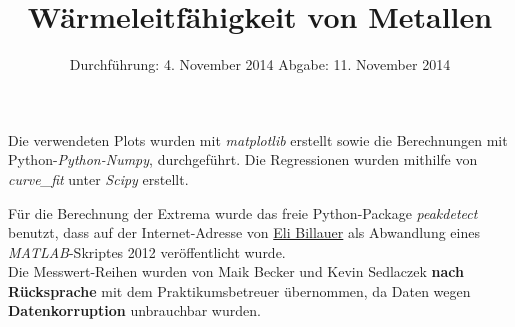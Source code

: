 
\usepackage{longtable}

\subject{Versuch 204}
\title{Wärmeleitfähigkeit von Metallen}

\date{
  Durchführung: 4. November 2014
  \hspace{1em}
  Abgabe: 11. November 2014
}


\maketitle
\thispagestyle{empty}
\newpage
\nocite{Helena}




%
%
%


\printbibliography
\noindent Die verwendeten Plots wurden mit \textit{matplotlib}\cite{matplotlib} erstellt sowie die Berechnungen mit Python-\textit{Python-Numpy}, \cite{numpy} durchgeführt.
Die Regressionen wurden mithilfe von \textit{curve\_fit} unter \textit{Scipy}\cite{scipy} erstellt.

Für die Berechnung der Extrema wurde das freie Python-Package \textit{peakdetect} benutzt, dass auf der Internet-Adresse von \href{http://billauer.co.il/peakdet.html}{Eli Billauer} als Abwandlung eines \textit{MATLAB}-Skriptes 2012 veröffentlicht wurde.\\

\noindent Die Messwert-Reihen wurden von Maik Becker und Kevin Sedlaczek \textbf{nach Rücksprache} mit dem Praktikumsbetreuer übernommen, da Daten wegen \textbf{Datenkorruption} unbrauchbar wurden.




